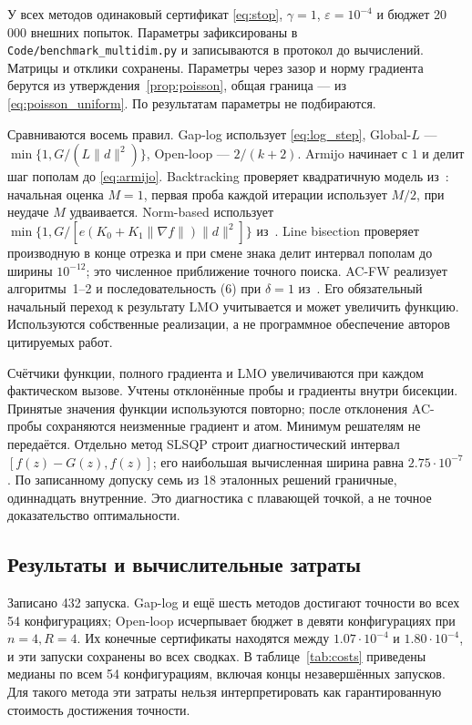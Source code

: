 У всех методов одинаковый сертификат \eqref{eq:stop}, $\gamma=1$,
$\varepsilon=10^{-4}$ и бюджет 20\,000 внешних попыток.
Параметры зафиксированы в \texttt{Code/benchmark\_multidim.py}
и записываются в протокол до вычислений. Матрицы и отклики сохранены.
Параметры через зазор и норму градиента берутся из
утверждения~\ref{prop:poisson}, общая граница --- из
\eqref{eq:poisson_uniform}. По результатам параметры не подбираются.

Сравниваются восемь правил. Gap-log использует \eqref{eq:log_step},
Global-$L$ --- $\min\{1,G/(L\|d\|^2)\}$, Open-loop --- $2/(k+2)$.
Armijo начинает с $1$ и делит шаг пополам до \eqref{eq:armijo}.
Backtracking проверяет квадратичную модель из~\cite{pedregosa}:
начальная оценка $M=1$, первая проба каждой итерации использует
$M/2$, при неудаче $M$ удваивается. Norm-based использует
$\min\{1,G/[e(K_0+K_1\|\nabla f\|)\|d\|^2]\}$ из~\cite{vyguzov}.
Line bisection проверяет производную в конце отрезка и при смене
знака делит интервал пополам до ширины $10^{-12}$; это численное
приближение точного поиска. AC-FW реализует алгоритмы~1--2 и
последовательность (6) при $\delta=1$ из~\cite{acfw}.
Его обязательный начальный переход к результату LMO учитывается
и может увеличить функцию. Используются собственные реализации,
а не программное обеспечение авторов цитируемых работ.

Счётчики функции, полного градиента и LMO увеличиваются при каждом
фактическом вызове. Учтены отклонённые пробы и градиенты внутри
бисекции. Принятые значения функции используются повторно;
после отклонения AC-пробы сохраняются неизменные градиент и атом.
Минимум решателям не передаётся. Отдельно метод SLSQP строит
диагностический интервал $[f(z)-G(z),f(z)]$; его наибольшая вычисленная
ширина равна $2.75\cdot10^{-7}$. По записанному допуску семь из
18 эталонных решений граничные, одиннадцать внутренние. Это
диагностика с плавающей точкой, а не точное доказательство оптимальности.

\subsection{Результаты и вычислительные затраты}
Записано 432 запуска. Gap-log и ещё шесть методов достигают точности
во всех 54 конфигурациях; Open-loop исчерпывает бюджет в девяти
конфигурациях при $n=4,R=4$. Их конечные сертификаты находятся
между $1.07\cdot10^{-4}$ и $1.80\cdot10^{-4}$, и эти запуски
сохранены во всех сводках. В таблице~\ref{tab:costs} приведены медианы
по всем 54 конфигурациям, включая концы незавершённых запусков.
Для такого метода эти затраты нельзя интерпретировать как
гарантированную стоимость достижения точности.

